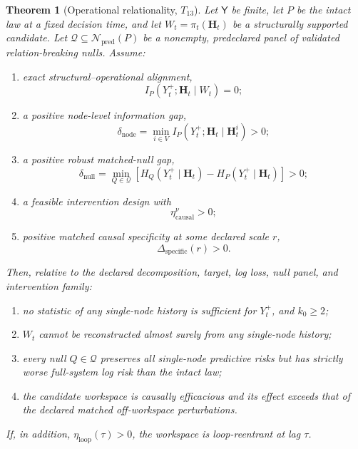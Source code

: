 \documentclass[11pt,letterpaper]{article}
\theoremstyle{plain}
\newtheorem{theorem}{Theorem}
\theoremstyle{definition}
\begin{document}
\begin{theorem}[Operational relationality, \(T_{13}\)]
\label{thm:operational-relationality}
Let \(\mathsf Y\) be finite, let \(P\) be the intact law at a fixed decision
time, and let \(W_t=\pi_t(\mathbf H_t)\) be a structurally supported candidate.
Let
\(\mathcal Q\subseteq\mathcal N_{\mathrm{pred}}(P)\) be a nonempty,
predeclared panel of validated relation-breaking nulls. Assume:
\begin{enumerate}
\item exact structural--operational alignment,
\[
I_P(Y_t^+;\mathbf H_t\mid W_t)=0;
\]
\item a positive node-level information gap,
\[
\delta_{\mathrm{node}}
=
\min_{i\in V}
I_P(Y_t^+;\mathbf H_t\mid\mathbf H_t^i)
>0;
\]
\item a positive robust matched-null gap,
\[
\delta_{\mathrm{null}}
=
\min_{Q\in\mathcal Q}
\left[
H_Q(Y_t^+\mid\mathbf H_t)
-
H_P(Y_t^+\mid\mathbf H_t)
\right]
>0;
\]
\item a feasible intervention design with
\[
\eta_{\mathrm{causal}}^{\nu}>0;
\]
\item positive matched causal specificity at some declared scale \(r\),
\[
\Delta_{\mathrm{specific}}(r)>0.
\]
\end{enumerate}
Then, relative to the declared decomposition, target, log loss, null panel, and
intervention family:
\begin{enumerate}
\item no statistic of any single-node history is sufficient for \(Y_t^+\), and
 \(k_0\geq2\);
\item \(W_t\) cannot be reconstructed almost surely from any single-node
 history;
\item every null \(Q\in\mathcal Q\) preserves all single-node predictive
 risks but has strictly worse full-system log risk than the intact law;
\item the candidate workspace is causally efficacious and its effect exceeds
 that of the declared matched off-workspace perturbations.
\end{enumerate}
If, in addition, \(\eta_{\mathrm{loop}}(\tau)>0\), the workspace is
loop-reentrant at lag \(\tau\).
\end{theorem}
\end{document}
